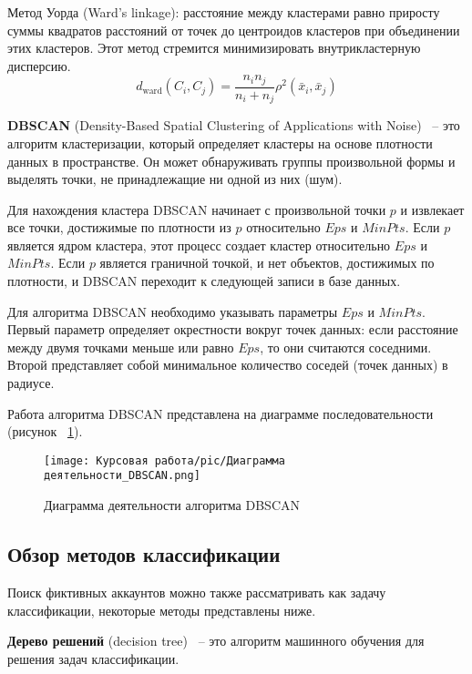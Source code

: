 \vspace{0.3cm}
Метод Уорда (Ward's linkage): расстояние между кластерами равно приросту суммы квадратов расстояний от точек до центроидов кластеров при объединении этих кластеров. Этот метод стремится минимизировать внутрикластерную дисперсию.
\[ d_{\text{ward}}(C_i, C_j) = \frac{n_i n_j}{n_i + n_j} \rho^2(\bar{x}_i, \bar{x}_j) \]


\textbf{DBSCAN} (Density-Based Spatial Clustering of Applications with Noise)~\cite{EsterKSX96} -- это алгоритм кластеризации, который определяет кластеры на основе плотности данных в пространстве. Он может обнаруживать группы произвольной формы и выделять точки, не принадлежащие ни одной из них (шум).
    
Для нахождения кластера DBSCAN начинает с произвольной точки $p$ и извлекает все точки, достижимые по плотности из $p$ относительно $\textit{Eps}$ и $\textit{MinPts}$. Если $p$ является ядром кластера, этот процесс создает кластер относительно $\textit{Eps}$ и $\textit{MinPts}$. Если $p$ является граничной точкой, и нет объектов, достижимых по плотности, и DBSCAN переходит к следующей записи в базе данных.

Для алгоритма DBSCAN необходимо указывать параметры $\textit{Eps}$ и $\textit{MinPts}$. Первый параметр определяет окрестности вокруг точек данных: если расстояние между двумя точками меньше или равно $\textit{Eps}$, то они считаются соседними. Второй представляет собой минимальное количество соседей (точек данных) в радиусе.

Работа алгоритма DBSCAN представлена на диаграмме последовательности (рисунок ~\ref{ris:actionsDBSCAN}).

\begin{figure}[H]
    \texttt{[image: Курсовая работа/pic/Диаграмма деятельности\_DBSCAN.png]}
    \caption{Диаграмма деятельности алгоритма DBSCAN}
    \label{ris:actionsDBSCAN}
\end{figure}

\vspace{1.5em}
\subsection{Обзор методов классификации}
\label{subsec:VariantsClass}
Поиск фиктивных аккаунтов можно также рассматривать как задачу классификации, некоторые методы представлены ниже.

\textbf{Дерево решений} (decision tree)~\cite{BreimanFOS84} -- это алгоритм машинного обучения для решения задач классификации.

